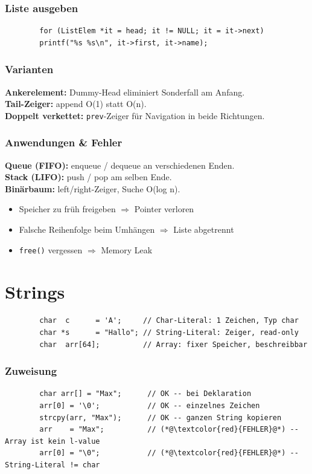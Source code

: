 \documentclass[a4paper,9pt]{article}
\begin{document}
	\subsubsection{Liste ausgeben}
	\begin{lstlisting}
		for (ListElem *it = head; it != NULL; it = it->next)
		printf("%s %s\n", it->first, it->name);
	\end{lstlisting}
	
	\subsubsection{Varianten}
	\textbf{Ankerelement:} Dummy-Head eliminiert Sonderfall am Anfang.\\
	\textbf{Tail-Zeiger:} append O(1) statt O(n).\\
	\textbf{Doppelt verkettet:} \texttt{prev}-Zeiger für Navigation in beide Richtungen.
	
	\subsubsection{Anwendungen \& Fehler}
	\textbf{Queue (FIFO):} enqueue / dequeue an verschiedenen Enden.\\
	\textbf{Stack (LIFO):} push / pop am selben Ende.\\
	\textbf{Binärbaum:} left/right-Zeiger, Suche O(log n).
	
	\begin{itemize}
		\item Speicher zu früh freigeben $\Rightarrow$ Pointer verloren
		\item Falsche Reihenfolge beim Umhängen $\Rightarrow$ Liste abgetrennt
		\item \texttt{free()} vergessen $\Rightarrow$ Memory Leak
	\end{itemize}
	
	\section{Strings}
	\begin{lstlisting}
		char  c      = 'A';     // Char-Literal: 1 Zeichen, Typ char
		char *s      = "Hallo"; // String-Literal: Zeiger, read-only
		char  arr[64];          // Array: fixer Speicher, beschreibbar
	\end{lstlisting}
	
	\subsubsection{Zuweisung}
	\begin{lstlisting}
		char arr[] = "Max";      // OK -- bei Deklaration
		arr[0] = '\0';           // OK -- einzelnes Zeichen
		strcpy(arr, "Max");      // OK -- ganzen String kopieren
		arr    = "Max";          // (*@\textcolor{red}{FEHLER}@*) -- Array ist kein l-value
		arr[0] = "\0";           // (*@\textcolor{red}{FEHLER}@*) -- String-Literal != char
	\end{lstlisting}
	
\end{document}
